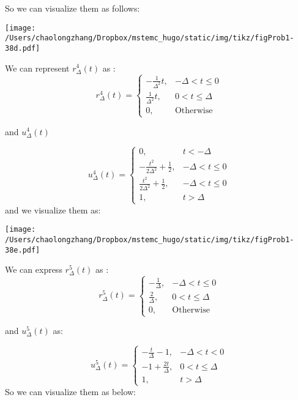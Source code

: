 \documentclass[koma,a4paper,utopia,12pt,listings-color,microtype,paralist,colorlinks,urlcolor=red]{org-article}
\begin{document}
So we can visualize them as follows:

\begin{center}
\texttt{[image: /Users/chaolongzhang/Dropbox/mstemc\_hugo/static/img/tikz/figProb1-38d.pdf]}
\end{center}

We can represent \(r_{\Delta}^{4}(t)\) as :
\begin{equation*}
r_{\Delta}^{4}(t) =
\begin{cases}
- \frac{1}{\Delta^{2}} t , &  -\Delta < t \leq 0 \\
\frac{1}{\Delta^{2}} t , &   0 < t \leq \Delta  \\
0, & \mathrm{Otherwise}
\end{cases}
\end{equation*}

and \(u_{\Delta}^{4}(t)\)

\begin{equation*}
u_{\Delta}^{4}(t) =
\begin{cases}
0, &  t < -\Delta \\
- \frac{t^{2}}{2\Delta^{2}} + \frac{1}{2}, & - \Delta < t \leq 0\\
 \frac{t^{2}}{2\Delta^{2}} + \frac{1}{2}, & - \Delta < t \leq 0\\
1, & t > \Delta
\end{cases}
\end{equation*}
and we visualize them as:


\begin{center}
\texttt{[image: /Users/chaolongzhang/Dropbox/mstemc\_hugo/static/img/tikz/figProb1-38e.pdf]}
\end{center}

We can express \(r_{\Delta}^{5}(t)\) as :
\begin{equation*}
r_{\Delta}^{5}(t) =
\begin{cases}
- \frac{1}{\Delta} , & -\Delta < t \leq 0 \\
\frac{2}{\Delta} , & 0 < t \leq \Delta \\
0, & \mathrm{Otherwise}
\end{cases}
\end{equation*}

and \(u_{\Delta}^{5}(t)\) as:

\begin{equation*}
u_{\Delta}^{5}(t) =
\begin{cases}
- \frac{t}{\Delta} -1, & -\Delta < t < 0 \\
-1 + \frac{2t}{\Delta} , & 0 < t \leq \Delta \\
1,& t > \Delta
\end{cases}
\end{equation*}
So we can visualize them as below:
\end{document}
